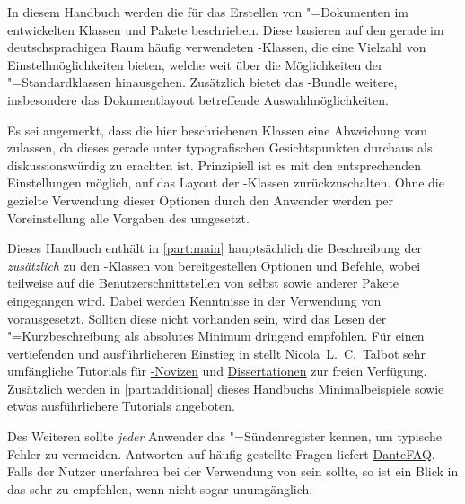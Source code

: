 \addchap[tocentry={}]{\prefacename}
In diesem Handbuch werden die für das Erstellen von "=Dokumenten 
im \href{https://tu-dresden.de/cd}{\TUDCD} entwickelten Klassen und Pakete 
beschrieben. Diese basieren auf den gerade im deutschsprachigen Raum häufig 
verwendeten \KOMAScript-Klassen, die eine Vielzahl von Einstellmöglichkeiten 
bieten, welche weit über die Möglichkeiten der "=Standardklassen 
hinausgehen. Zusätzlich bietet das \TUDScript-Bundle weitere, insbesondere das 
Dokumentlayout betreffende Auswahlmöglichkeiten.

Es sei angemerkt, dass die hier beschriebenen Klassen eine Abweichung vom 
\TUDCD zulassen, da dieses gerade unter typografischen Gesichtspunkten 
durchaus als diskussionswürdig zu erachten ist. Prinzipiell ist es mit den 
entsprechenden Einstellungen möglich, auf das Layout der \KOMAScript-Klassen 
zurückzuschalten. Ohne die gezielte Verwendung dieser Optionen durch den 
Anwender werden per Voreinstellung alle Vorgaben des \CDs umgesetzt.

Dieses Handbuch enthält in \autoref{part:main} hauptsächlich die Beschreibung 
der \emph{zusätzlich} zu den \KOMAScript-Klassen von \TUDScript bereitgestellen
Optionen und Befehle, wobei teilweise auf die Benutzerschnittstellen von 
\KOMAScript selbst sowie anderer Pakete eingegangen wird. Dabei werden 
Kenntnisse in der Verwendung von  vorausgesetzt. Sollten diese 
nicht vorhanden sein, wird das Lesen der "=Kurzbeschreibung 
 als absolutes 
Minimum dringend empfohlen. Für einen vertiefenden und ausführlicheren Einstieg 
in  stellt Nicola~L.~C.~Talbot sehr umfängliche Tutorials für 
\href{http://www.dickimaw-books.com/latex/novices/}{-Novizen} 
und \href{http://www.dickimaw-books.com/latex/thesis/}{Dissertationen} zur 
freien Verfügung. Zusätzlich werden in \autoref{part:additional} dieses 
Handbuchs Minimalbeispiele sowie etwas ausführlichere Tutorials angeboten.

Des Weiteren sollte \emph{jeder} Anwender das "=Sündenregister 
 kennen, um 
typische Fehler zu vermeiden. Antworten auf häufig gestellte Fragen liefert 
\href{http://projekte.dante.de/DanteFAQ/WebHome}{DanteFAQ}. Falls der Nutzer 
unerfahren bei der Verwendung von \KOMAScript sein sollte, so ist ein Blick 
in das  sehr zu empfehlen, wenn nicht sogar 
unumgänglich.

